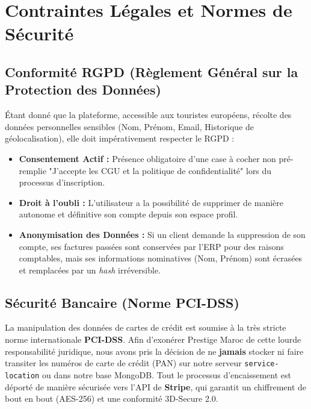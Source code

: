 \section{Contraintes Légales et Normes de Sécurité}

\subsection{Conformité RGPD (Règlement Général sur la Protection des Données)}
Étant donné que la plateforme, accessible aux touristes européens, récolte des données personnelles sensibles (Nom, Prénom, Email, Historique de géolocalisation), elle doit impérativement respecter le RGPD :
\begin{itemize}
    \item \textbf{Consentement Actif :} Présence obligatoire d'une case à cocher non pré-remplie "J'accepte les CGU et la politique de confidentialité" lors du processus d'inscription.
    \item \textbf{Droit à l'oubli :} L'utilisateur a la possibilité de supprimer de manière autonome et définitive son compte depuis son espace profil.
    \item \textbf{Anonymisation des Données :} Si un client demande la suppression de son compte, ses factures passées sont conservées par l'ERP pour des raisons comptables, mais ses informations nominatives (Nom, Prénom) sont écrasées et remplacées par un \textit{hash} irréversible.
\end{itemize}

\subsection{Sécurité Bancaire (Norme PCI-DSS)}
La manipulation des données de cartes de crédit est soumise à la très stricte norme internationale \textbf{PCI-DSS}. Afin d'exonérer Prestige Maroc de cette lourde responsabilité juridique, nous avons pris la décision de ne \textbf{jamais} stocker ni faire transiter les numéros de carte de crédit (PAN) sur notre serveur \texttt{service-location} ou dans notre base MongoDB. Tout le processus d'encaissement est déporté de manière sécurisée vers l'API de \textbf{Stripe}, qui garantit un chiffrement de bout en bout (AES-256) et une conformité 3D-Secure 2.0.
